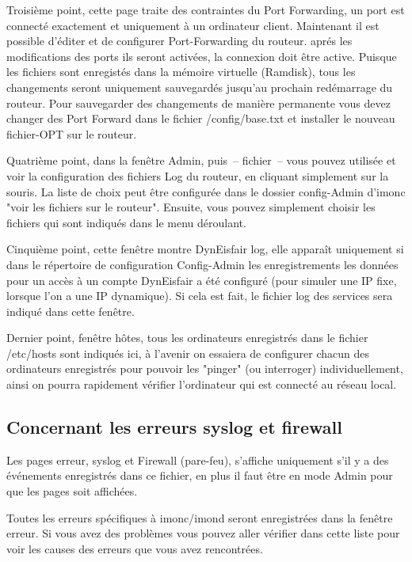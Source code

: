   Troisième point, cette page traite des contraintes du Port Forwarding,
  un port est connecté exactement et uniquement à un ordinateur client.
  Maintenant il est possible d'éditer et de configurer Port-Forwarding du
  routeur. aprés les modifications des ports ils seront activées, la
  connexion doit être active. Puisque les fichiers sont enregistés dans la
  mémoire virtuelle (Ramdisk), tous les changements seront uniquement
  sauvegardés jusqu'au prochain redémarrage du routeur. Pour sauvegarder des
  changements de manière permanente vous devez changer des Port Forward dans
  le fichier /config/base.txt et installer le nouveau fichier-OPT sur le routeur.

  Quatrième point, dans la fenêtre Admin, puis~-- fichier~-- vous pouvez utilisée
  et voir la configuration des fichiers Log du routeur, en cliquant
  simplement sur la souris. La liste de choix peut être configurée dans le
  dossier config-Admin d'imonc "voir les fichiers sur le routeur". Ensuite,
  vous pouvez simplement choisir les fichiers qui sont indiqués dans le menu
  déroulant.

  Cinquième point, cette fenêtre montre DynEisfair log, elle apparaît
  uniquement si dans le répertoire de configuration Config-Admin les
  enregistrements les données pour un accès à un compte DynEisfair a
  été configuré (pour simuler une IP fixe, lorsque l'on a une IP dynamique).
  Si cela est fait, le fichier log des services sera indiqué dans cette fenêtre.

  Dernier point, fenêtre hôtes, tous les ordinateurs enregistrés dans le fichier
  /etc/hosts sont indiqués ici, à l'avenir on essaiera de configurer chacun des
  ordinateurs enregistrés pour pouvoir les "pinger" (ou interroger)
  individuellement, ainsi on pourra rapidement vérifier l'ordinateur qui est 
  connecté au réseau local.

  \subsection{Concernant les erreurs syslog et firewall}

  Les pages erreur, syslog et Firewall (pare-feu), s'affiche uniquement
  s'il y a des événements enregistrés dans ce fichier, en plus il faut
  être en mode Admin pour que les pages soit affichées.

  Toutes les erreurs spécifiques à imonc/imond seront enregistrées dans la 
  fenêtre erreur. Si vous avez des problèmes vous pouvez aller vérifier dans
  cette liste pour voir les causes des erreurs que vous avez rencontrées.

